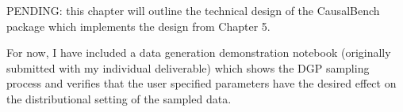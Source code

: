 \documentclass[../main.tex]{subfiles}
\begin{document}
PENDING: this chapter will outline the technical design of the CausalBench package which implements the design from Chapter 5.

For now, I have included a data generation demonstration notebook (originally submitted with my individual deliverable) which shows the DGP sampling process and verifies that the user specified parameters have the desired effect on the distributional setting of the sampled data.
\end{document}
